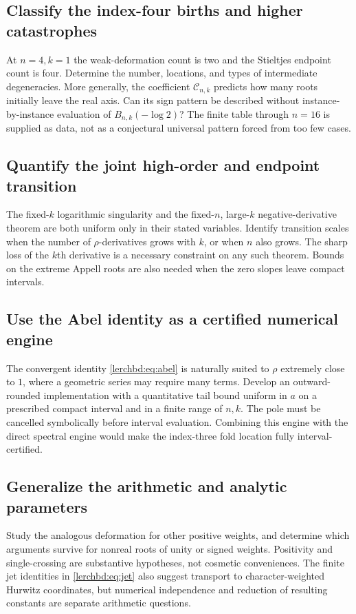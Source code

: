 \subsection{Classify the index-four births and higher catastrophes}
At $n=4,k=1$ the weak-deformation count is two and the Stieltjes endpoint count is four. Determine the number, locations, and types of intermediate degeneracies. More generally, the coefficient $\mathcal C_{n,k}$ predicts how many roots initially leave the real axis. Can its sign pattern be described without instance-by-instance evaluation of $B_{n,k}(-\log2)$? The finite table through $n=16$ is supplied as data, not as a conjectural universal pattern forced from too few cases.

\subsection{Quantify the joint high-order and endpoint transition}
The fixed-$k$ logarithmic singularity and the fixed-$n$, large-$k$ negative-derivative theorem are both uniform only in their stated variables. Identify transition scales when the number of $\rho$-derivatives grows with $k$, or when $n$ also grows. The sharp loss of the $k$th derivative is a necessary constraint on any such theorem. Bounds on the extreme Appell roots are also needed when the zero slopes leave compact intervals.

\subsection{Use the Abel identity as a certified numerical engine}
The convergent identity \eqref{lerchbd:eq:abel} is naturally suited to $\rho$ extremely close to $1$, where a geometric series may require many terms. Develop an outward-rounded implementation with a quantitative tail bound uniform in $a$ on a prescribed compact interval and in a finite range of $n,k$. The pole must be cancelled symbolically before interval evaluation. Combining this engine with the direct spectral engine would make the index-three fold location fully interval-certified.

\subsection{Generalize the arithmetic and analytic parameters}
Study the analogous deformation for other positive weights, and determine which arguments survive for nonreal roots of unity or signed weights. Positivity and single-crossing are substantive hypotheses, not cosmetic conveniences. The finite jet identities in \eqref{lerchbd:eq:jet} also suggest transport to character-weighted Hurwitz coordinates, but numerical independence and reduction of resulting constants are separate arithmetic questions.

